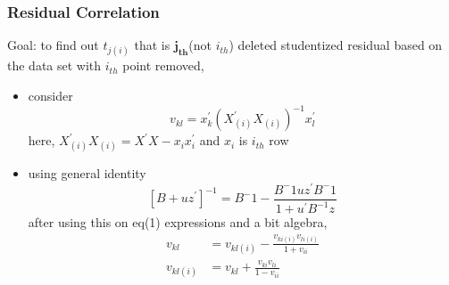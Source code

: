 \documentclass[
	11pt, %
]{beamer}
\begin{document}
\begin{frame}[allowframebreaks]
	\frametitle{Residual Correlation}
	\begin{block}
		{Goal:} to find out $t_{j(i)}$ that is $\mathbf{j_{th}}$(not $i_{th}$) deleted studentized residual based on the data set with $i_{th}$ point removed, 
	\end{block}
		
	\begin{itemize}
		\item consider
		\begin{equation}
			v_{kl}=x_k^{'}(X_{(i)}^{'}X_{(i)})^{-1}x_l^{'}
		\end{equation}
		here, $X_{(i)}^{'}X_{(i)}=X^{'}X-x_ix_i^{'}$ and $x_i$ is $i_{th}$ row
		\item using general identity
		\begin{equation*}
			\left[B+uz^{'}\right]^{-1}=B^-1-\frac{B^-1uz^{'}B^-1}{1+u^{'}B^{-1}z}
		\end{equation*}
		after using this on eq(1) expressions and a bit algebra,
		\begin{align}
			v_{kl}&=v_{kl(i)}-\frac{v_{ki(i)}v_{li(i)}}{1+v_{ii}}\\
			v_{kl(i)}&=v_{kl}+\frac{v_{ki}v_{li}}{1-v_{ii}}
		\end{align}
		

\end{itemize}
\end{frame}
\end{document}
